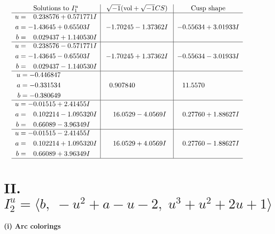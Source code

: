 \documentclass[1p]{elsarticle_modified}
\theoremstyle{definition}
\newcommand{\I}{\sqrt{-1}}
\begin{document}
$$\begin{array}{c|c|c}  
\text{Solutions to }I^u_{1}& \I (\text{vol} + \sqrt{-1}CS) & \text{Cusp shape}\\
 \hline 
\begin{aligned}
u &= \phantom{-}0.238576 + 0.571771 I \\
a &= -1.43645 + 0.65503 I \\
b &= \phantom{-}0.029437 + 1.140530 I\end{aligned}
 & -1.70245 - 1.37362 I & -0.55634 + 3.01933 I \\ \hline\begin{aligned}
u &= \phantom{-}0.238576 - 0.571771 I \\
a &= -1.43645 - 0.65503 I \\
b &= \phantom{-}0.029437 - 1.140530 I\end{aligned}
 & -1.70245 + 1.37362 I & -0.55634 - 3.01933 I \\ \hline\begin{aligned}
u &= -0.446847\phantom{ +0.000000I} \\
a &= -0.331534\phantom{ +0.000000I} \\
b &= -0.380649\phantom{ +0.000000I}\end{aligned}
 & \phantom{-}0.907840\phantom{ +0.000000I} & \phantom{-}11.5570\phantom{ +0.000000I} \\ \hline\begin{aligned}
u &= -0.01515 + 2.41455 I \\
a &= \phantom{-}0.102214 - 1.095320 I \\
b &= \phantom{-}0.66089 - 3.96349 I\end{aligned}
 & \phantom{-}16.0529 - 4.0569 I & \phantom{-}0.27760 + 1.88627 I \\ \hline\begin{aligned}
u &= -0.01515 - 2.41455 I \\
a &= \phantom{-}0.102214 + 1.095320 I \\
b &= \phantom{-}0.66089 + 3.96349 I\end{aligned}
 & \phantom{-}16.0529 + 4.0569 I & \phantom{-}0.27760 - 1.88627 I\\
 \hline 
 \end{array}$$\newpage\newpage\renewcommand{\arraystretch}{1}
\centering \section*{II. $I^u_{2}= \langle b,\;- u^2+a- u-2,\;u^3+u^2+2 u+1 \rangle$}
\flushleft \textbf{(i) Arc colorings}\\
\end{document}
